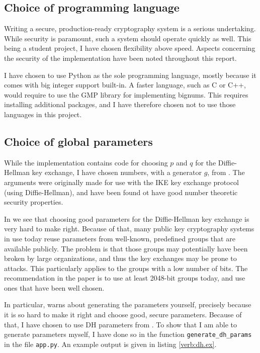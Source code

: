 \documentclass[a4paper,english,12pt]{article}
\begin{document}
\subsection{Choice of programming language}
Writing a secure, production-ready cryptography system is a serious
undertaking. While security is paramount, such a system should operate quickly
as well. This being a student project, I have chosen flexibility above
speed. Aspects concerning the security of the implementation have been noted
throughout this report.

I have chosen to use Python as the sole programming language, mostly because it
comes with big integer support built-in. A faster language, such as C or C++,
would require to use the GMP library \cite{wiki:gmp} for implementing bignums.
This requires installing additional packages, and I have therefore chosen not
to use those languages in this project.

\subsection{Choice of global parameters}
While the implementation contains code for choosing $p$ and $q$ for the
Diffie-Hellman key exchange, I have chosen numbers, with a generator $g$, from
\cite{rfc3526}. The arguments were originally made for use with the IKE key
exchange protocol (using Diffie-Hellman), and have been found ot have good
number theoretic security properties.

In \cite{dh.params} we see that choosing good parameters for the Diffie-Hellman
key exchange is very hard to make right. Because of that, many public key
cryptography systems in use today reuse parameters from well-known, predefined
groups that are available publicly. The problem is that those groups may
potentially have been broken by large organizations, and thus the key exchanges
may be prone to attacks. This particularly applies to the groups with a low
number of bits. The recommendation in the paper is to use at least 2048-bit
groups today, and use ones that have been well chosen. 

In particular, \cite{dh.params} warns about generating the parameters yourself,
precisely because it is so hard to make it right and choose good, secure
parameters. Because of that, I have chosen to use DH parameters from
\cite{rfc3526}. To show that I am able to generate parameters myself, I have
done so in the function \texttt{generate\_dh\_params} in the file
\texttt{app.py}. An example output is given in listing \vref{verb:dh.ex}.
\end{document}
